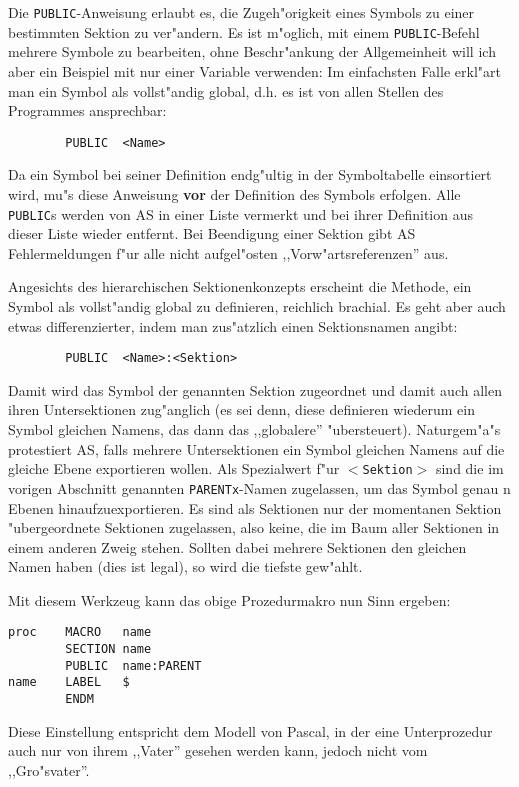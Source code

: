 \documentclass[12pt,a4paper,twoside]{report}
\newcommand{\bb}[1]{{\bf #1}}
\newcommand{\tty}[1]{{\tt #1}}
\begin{document}
{Die \tty{PUBLIC}-Anweisung erlaubt es, die Zugeh"origkeit eines Symbols
zu einer bestimmten Sektion zu ver"andern.  Es ist m"oglich, mit einem
\tty{PUBLIC}-Befehl mehrere Symbole zu bearbeiten, ohne Beschr"ankung
der Allgemeinheit will ich aber ein Beispiel mit nur einer Variable verwenden:
Im einfachsten Falle erkl"art man ein Symbol als vollst"andig global, d.h.
es ist von allen Stellen des Programmes ansprechbar:
\begin{verbatim}
        PUBLIC  <Name>
\end{verbatim}
Da ein Symbol bei seiner Definition endg"ultig in der Symboltabelle
einsortiert wird, mu"s diese Anweisung \bb{vor} der Definition des
Symbols erfolgen.  Alle \tty{PUBLIC}s werden von AS in einer Liste
vermerkt und bei ihrer Definition aus dieser Liste wieder entfernt.  Bei
Beendigung einer Sektion gibt AS Fehlermeldungen f"ur alle nicht
aufgel"osten ,,Vorw"artsreferenzen'' aus.
\par
Angesichts des hierarchischen Sektionenkonzepts erscheint die Methode,
ein Symbol als vollst"andig global zu definieren, reichlich brachial.
Es geht aber auch etwas differenzierter, indem man zus"atzlich einen
Sektionsnamen angibt:
\begin{verbatim}
        PUBLIC  <Name>:<Sektion>
\end{verbatim}
Damit wird das Symbol der genannten Sektion zugeordnet und damit auch
allen ihren Untersektionen zug"anglich (es sei denn, diese definieren
wiederum ein Symbol gleichen Namens, das dann das ,,globalere''
"ubersteuert).  Naturgem"a"s protestiert AS, falls mehrere Untersektionen
ein Symbol gleichen Namens auf die gleiche Ebene exportieren wollen.
Als Spezialwert f"ur \tty{$<$Sektion$>$} sind die im vorigen Abschnitt
genannten \tty{PARENTx}-Namen zugelassen, um das Symbol genau n Ebenen hinaufzuexportieren.
Es sind als Sektionen nur der momentanen Sektion "ubergeordnete Sektionen
zugelassen, also keine, die im Baum aller Sektionen in einem anderen Zweig
stehen.  Sollten dabei mehrere Sektionen den gleichen Namen haben (dies ist
legal), so wird die tiefste gew"ahlt.
\par
Mit diesem Werkzeug kann das obige Prozedurmakro nun Sinn ergeben:
\begin{verbatim}
proc    MACRO   name
        SECTION name
        PUBLIC  name:PARENT
name    LABEL   $
        ENDM
\end{verbatim}
Diese Einstellung entspricht dem Modell von Pascal, in der eine
Unterprozedur auch nur von ihrem ,,Vater'' gesehen werden kann, jedoch
nicht vom ,,Gro"svater''.
}
\end{document}
